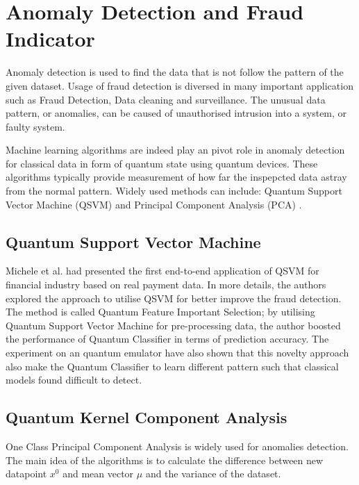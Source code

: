 \section{Anomaly Detection and Fraud Indicator} \label{Sec: Anomaly Detection and Fraud Indicator}

Anomaly detection is used to find the data that is not follow the pattern of the given dataset.
Usage of fraud detection is diversed in many important application such as Fraud Detection, Data cleaning and surveillance.
The unusual data pattern, or anomalies, can be caused of unauthorised intrusion into a system, or faulty system.

Machine learning algorithms are indeed play an pivot role in anomaly detection for classical data in form of quantum state using quantum devices.
These algorithms typically provide measurement of how far the inspepcted data astray from the normal pattern.
Widely used methods can include: Quantum Support Vector Machine (QSVM) \cite{grossiMixedQuantumClassical2022,kyriienkoUnsupervisedQuantumMachine2022} and Principal Component Analysis (PCA) \cite{lloydQuantumPrincipalComponent2014}.

\subsection{Quantum Support Vector Machine}
Michele et al. \cite{grossiMixedQuantumClassical2022} had presented the first end-to-end application of QSVM for financial industry based on real payment data.
In more details, the authors explored the approach to utilise QSVM for better improve the fraud detection.
The method is called Quantum Feature Important Selection; by utilising Quantum Support Vector Machine for pre-processing data, the author boosted the performance of Quantum Classifier in terms of prediction accuracy.
The experiment on an quantum emulator have also shown that this novelty approach also make the Quantum Classifier to learn different pattern such that classical models found difficult to detect.

\subsection{Quantum Kernel Component Analysis}
One Class Principal Component Analysis is widely used for anomalies detection.
The main idea of the algorithms is to calculate the difference between new datapoint $x^0$ and mean vector $\mu$ and the variance of the dataset.

